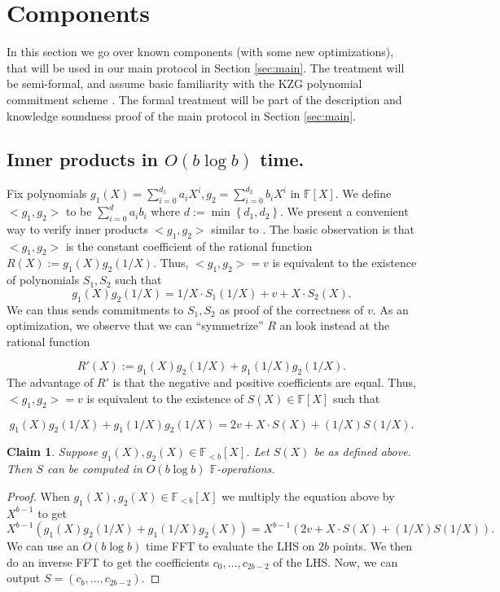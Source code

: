 \documentclass[11pt]{article} %
\newcommand{\F}{\ensuremath{\mathbb F}\xspace}
\newcommand{\defeq}{:=}
\newcommand{\set}[1]{\ensuremath{\left\{#1\right\}}\xspace}
\newcommand{\polysofdeg}[1]{\ensuremath{\F_{< #1}[X]}\xspace}
\newcommand{\polys}{\ensuremath{\F[X]}\xspace}
\newtheorem{claim}[lemma]{Claim}
\begin{document}
\section{Components}\label{sec:components}
In this section we go over known components (with some new optimizations), that will be used in our main protocol in Section \ref{sec:main}. The treatment will  be  semi-formal, and assume basic familiarity with the KZG polynomial commitment scheme \cite{kzg}. The formal treatment will be part of the description and knowledge soundness proof of the main protocol in Section \ref{sec:main}.
\subsection{Inner products in $O(b\log b)$ time.}
Fix polynomials $g_1(X)=\sum_{i=0}^{d_1} a_i X^i,g_2=\sum_{i=0}^{d_2} b_i X^i$ in $\polys$.
We define $<g_1,g_2>$ to be $\sum_{i=0}^d a_i b_i$ where $d\defeq \min \set{d_1,d_2}$. 
We present a convenient way to verify inner products $<g_1,g_2>$ similar to \cite{bootle,sonic}.
The basic observation is that  $<g_1,g_2>$ is the constant coefficient of the rational function
$R(X)\defeq g_1(X) g_2(1/X)$.
Thus, $<g_1,g_2>=v$ is equivalent to the existence of polynomials $S_1,S_2$ such that
\[g_1(X) g_2(1/X)=1/X\cdot S_1(1/X) + v + X\cdot S_2(X).\] 
We can thus sends commitments to $S_1,S_2$ as proof of the correctness of $v$.
As an optimization, we observe that we can ``symmetrize'' $R$ an look instead at the rational function

\[R'(X)\defeq g_1(X) g_2(1/X)+g_1(1/X) g_2(1/X).\]
The advantage of $R'$ is that the negative and positive coefficients are equal. Thus,
$<g_1,g_2>=v$ is equivalent to the existence of $S(X)\in \polys$ such that

\[ g_1(X) g_2(1/X)+g_1(1/X) g_2(1/X)=2v + X\cdot S(X) + (1/X)S(1/X).\]

\begin{claim}\label{clm:computeS}
 Suppose $g_1(X),g_2(X)\in \polysofdeg{b}$. Let $S(X)$ be as defined above.
 Then $S$ can be computed in $O(b \log b)$ \F-operations.
\end{claim}
\begin{proof}
When $g_1(X),g_2(X)\in \polysofdeg{b}$ we multiply the equation above by $X^{b-1}$ to get
\[ X^{b-1}(g_1(X) g_2(1/X)+g_1(1/X) g_2(X))=X^{b-1}(2v + X\cdot S(X) + (1/X)S(1/X)).\]
We can use an $O(b \log b )$ time FFT to evaluate the LHS on $2b$ points. We then do an inverse
FFT to get the coefficients $c_0,\ldots,c_{2b-2}$ of the LHS. Now, we can output $S=(c_b,\ldots, c_{2b-2})$.
\end{proof}
\end{document}
